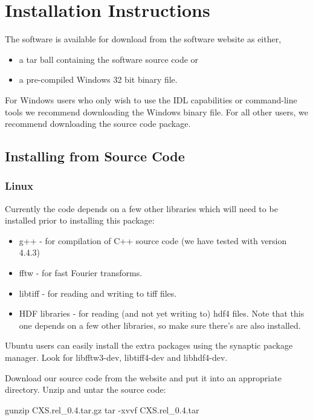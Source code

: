 \documentclass[]{cxs-software}
\begin{document}
\section{Installation Instructions}
\label{installation}

The software is available for download from the software website as either,
\begin{itemize}
\item a tar ball containing the software source code or
\item a pre-compiled Windows 32 bit binary file.
\end{itemize}

For Windows users who only wish to use the IDL capabilities or
command-line tools we recommend downloading the Windows binary file. For
all other users, we recommend downloading the source code package.

\subsection{Installing from Source Code}

\subsubsection{Linux}

Currently the code depends on a few other libraries which will need to
be installed prior to installing this package:
\begin{itemize}
\item g++\cite{} - for compilation of C++ source code (we have tested with version 4.4.3)
\item fftw\cite{} - for fast Fourier transforms.
\item libtiff\cite{} - for reading and writing to tiff files.
\item HDF libraries\cite{} - for reading (and not yet writing to) hdf4
  files. Note that this one depends on a few other libraries, so make
  sure there's are also installed.
\end{itemize}

Ubuntu users can easily install the extra packages using the synaptic
package manager. Look for libfftw3-dev, libtiff4-dev and libhdf4-dev.

Download our source code from the website and put
it into an appropriate directory. Unzip and untar the source code: 
\begin{myverbatim}
  gunzip CXS.rel_0.4.tar.gz 
  tar -xvvf CXS.rel_0.4.tar
\end{myverbatim}
\end{document}
